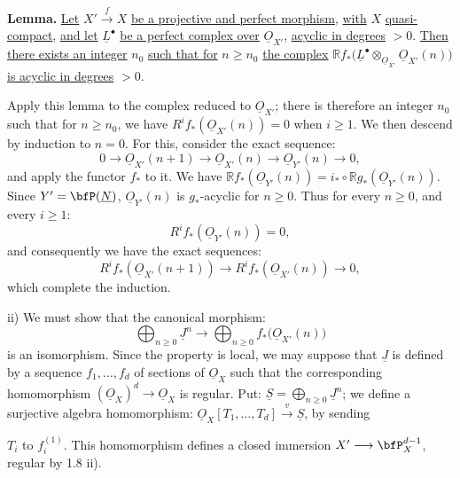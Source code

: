 %
\textbf{Lemma.} \uline{Let} \(X'\xrightarrow{f}X\) \uline{be a projective and perfect morphism}, \uline{with} \(X\) \uline{quasi-compact}, \uline{and let} \(\underline{L}^\bullet\) \uline{be a perfect complex over} \(\underline{O}_{X'}\), \uline{acyclic in degrees} \(>0\). \uline{Then there exists an integer} \(n_0\) \uline{such that for} \(n\ge n_0\) \uline{the complex} \(\mathbb Rf_*\bigl(\underline{L}^\bullet\otimes_{\underline{O}_{X'}}\underline{O}_{X'}(n)\bigr)\) \uline{is acyclic in degrees} \(>0\).

Apply this lemma to the complex reduced to \(\underline{O}_{X'}\); there is therefore an integer \(n_0\) such that for \(n\ge n_0\), we have \(R^if_*(\underline{O}_{X'}(n))=0\) when \(i\ge1\). We then descend by induction to \(n=0\). For this, consider the exact sequence:
\[
0\longrightarrow
\underline{O}_{X'}(n+1)
\longrightarrow
\underline{O}_{X'}(n)
\longrightarrow
\underline{O}_{Y'}(n)
\longrightarrow0,
\]
and apply the functor \(f_*\) to it. We have \(\mathbb Rf_*(\underline{O}_{Y'}(n))=i_*\circ\mathbb Rg_*(\underline{O}_{Y'}(n))\). Since \(Y'=\bfP(\underline{N})\), \(\underline{O}_{Y'}(n)\) is \(g_*\)-acyclic for \(n\ge0\). Thus for every \(n\ge0\), and every \(i\ge1\):
\[
R^if_*(\underline{O}_{Y'}(n))=0,
\]
and consequently we have the exact sequences:
\[
R^if_*(\underline{O}_{X'}(n+1))
\longrightarrow
R^if_*(\underline{O}_{X'}(n))
\longrightarrow0,
\]
which complete the induction.

ii) We must show that the canonical morphism:
\[
\bigoplus_{n\ge0}\underline{J}^n
\longrightarrow
\bigoplus_{n\ge0}f_*\bigl(\underline{O}_{X'}(n)\bigr)
\]
is an isomorphism. Since the property is local, we may suppose that \(\underline{J}\) is defined by a sequence \(f_1,\ldots,f_d\) of sections of \(\underline{O}_X\) such that the corresponding homomorphism \((\underline{O}_X)^d\longrightarrow\underline{O}_X\) is regular. Put: \(\underline{S}=\bigoplus_{n\ge0}\underline{J}^n\); we define a surjective algebra homomorphism: \(\underline{O}_X[T_1,\ldots,T_d]\xrightarrow{v}\underline{S}\), by sending

%
\(T_i\) to \(f_i^{(1)}\). This homomorphism defines a closed immersion \(X'\longrightarrow\bfP_X^{d-1}\), regular by 1.8 ii).

